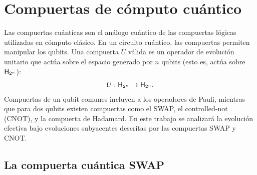 \section{Compuertas de cómputo cuántico}

Las compuertas cuánticas son el análogo cuántico de las compuertas lógicas utilizadas en cómputo clásico. En un circuito cuántico, las compuertas permiten manipular los qubits. Una compuerta $U$ válida es un operador de evolución unitario que actúa sobre el espacio generado por $n$ qubits (esto es, actúa sobre ${\sf H}_{2^{n}}$):
\begin{equation}
  U:{\sf H}_{2^{n}}\rightarrow{\sf H}_{2^{n}}.\nonumber
\end{equation}
Compuertas de un qubit comunes incluyen a los operadores de Pauli, mientras que para dos qubits existen compuertas como el SWAP, el controlled-not (CNOT), y la compuerta de Hadamard. En este trabajo se analizará la evolución efectiva bajo evoluciones subyacentes descritas por las compuertas SWAP y CNOT. 

\subsection{La compuerta cuántica SWAP}

